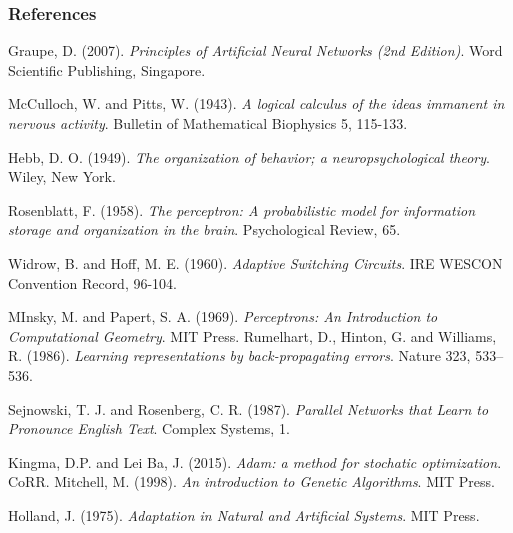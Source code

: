 \documentclass{beamer}
\begin{document}
\begin{frame}
\frametitle{References}
\begin{thebibliography}{99}
 {\sc Graupe, D.} (2007). \textit{Principles of Artificial Neural Networks (2nd Edition)}. Word Scientific Publishing, Singapore.
 
 {\sc McCulloch, W.} and {\sc Pitts, W}. (1943). \textit{A logical calculus of the ideas immanent in nervous activity}. Bulletin of Mathematical Biophysics 5, 115-133.

 {\sc Hebb, D. O.} (1949). \textit{The organization of behavior; a neuropsychological theory}. Wiley, New York.

 {\sc Rosenblatt, F.} (1958). \textit{The perceptron: A probabilistic model for information storage and organization in the brain}. Psychological Review, 65.

 {\sc Widrow, B.} and {\sc Hoff, M. E.} (1960). \textit{Adaptive Switching Circuits}. IRE WESCON Convention Record, 96-104.


\end{thebibliography}
\end{frame}
\begin{frame}
\begin{thebibliography}{99}
 {\sc MInsky, M.} and {\sc Papert, S. A.} (1969). \textit{Perceptrons: An Introduction to Computational Geometry}. MIT Press.
 {\sc Rumelhart, D.}, {\sc Hinton, G.} and {\sc Williams, R.} (1986). \textit{Learning representations by back-propagating errors}. Nature 323, 533–536.

 {\sc Sejnowski, T. J.} and {\sc Rosenberg, C. R.} (1987). \textit{Parallel Networks that Learn to Pronounce English Text}. Complex Systems, 1.

 {\sc Kingma, D.P.} and {\sc Lei Ba, J.} (2015). \textit{Adam: a method for stochatic optimization}. CoRR.
 {\sc Mitchell, M.} (1998). \textit{An introduction to Genetic Algorithms}. MIT Press.

 {\sc Holland, J.} (1975). \textit{Adaptation in Natural and Artificial Systems}. MIT Press. 
\end{thebibliography}
\end{frame}
\end{document}
